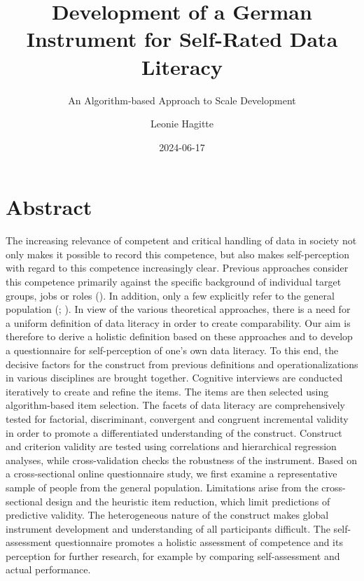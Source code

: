 \documentclass[
  12pt,
  a4paper,
  twoside]{article}
\title{Development of a German Instrument for Self-Rated Data Literacy}
\subtitle{An Algorithm-based Approach to Scale Development}
\author{Leonie Hagitte}
\date{2024-06-17}
\begin{document}
\maketitle

{
\setcounter{tocdepth}{2}
\tableofcontents
}
\newpage\null\thispagestyle{empty}\newpage

\section*{Abstract}\label{abstract}

The increasing relevance of competent and critical handling of data in society not only makes it possible to record this competence, but also makes self-perception with regard to this competence increasingly clear. Previous approaches consider this competence primarily against the specific background of individual target groups, jobs or roles (). In addition, only a few explicitly refer to the general population (; ). In view of the various theoretical approaches, there is a need for a uniform definition of data literacy in order to create comparability.
Our aim is therefore to derive a holistic definition based on these approaches and to develop a questionnaire for self-perception of one's own data literacy. To this end, the decisive factors for the construct from previous definitions and operationalizations in various disciplines are brought together. Cognitive interviews are conducted iteratively to create and refine the items. The items are then selected using algorithm-based item selection. The facets of data literacy are comprehensively tested for factorial, discriminant, convergent and congruent incremental validity in order to promote a differentiated understanding of the construct. Construct and criterion validity are tested using correlations and hierarchical regression analyses, while cross-validation checks the robustness of the instrument.
Based on a cross-sectional online questionnaire study, we first examine a representative sample of people from the general population. Limitations arise from the cross-sectional design and the heuristic item reduction, which limit predictions of predictive validity. The heterogeneous nature of the construct makes global instrument development and understanding of all participants difficult.
The self-assessment questionnaire promotes a holistic assessment of competence and its perception for further research, for example by comparing self-assessment and actual performance.
\end{document}
